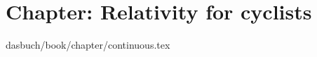 



\section{Chapter: Relativity for cyclists}
\label{c-continuous}
\noindent dasbuch/book/chapter/continuous.tex




%

%


